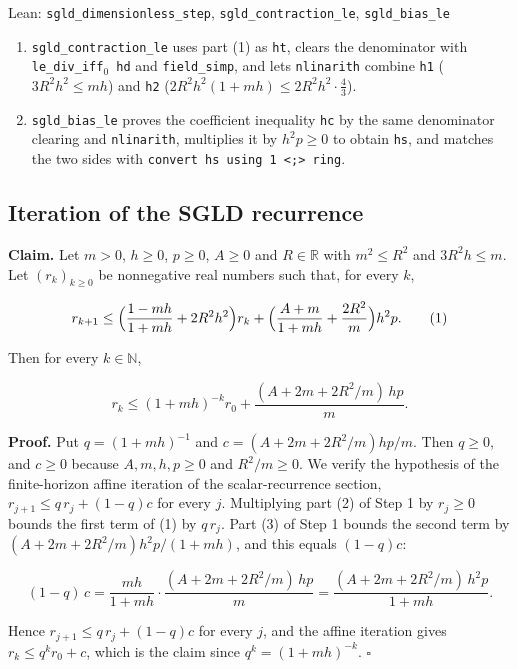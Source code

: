 \documentclass[11pt,a4paper]{report}
\begin{document}
\begin{leanbox}{Lean: \texttt{sgld\_\allowbreak{}dimensionless\_\allowbreak{}step}, \texttt{sgld\_\allowbreak{}contraction\_\allowbreak{}le}, \texttt{sgld\_\allowbreak{}bias\_\allowbreak{}le}}
\begin{enumerate}
\item \texttt{sgld\_\allowbreak{}contraction\_\allowbreak{}le} uses part (1) as \texttt{ht}, clears the denominator with \texttt{le\_\allowbreak{}div\_\allowbreak{}iff\ensuremath{{}_{0}} hd} and \texttt{field\_\allowbreak{}simp}, and lets \texttt{nlinarith} combine \texttt{h1} (\(3R^2h^2\le mh\)) and \texttt{h2} (\(2R^2h^2(1+mh)\le2R^2h^2\cdot\frac43\)).

\item \texttt{sgld\_\allowbreak{}bias\_\allowbreak{}le} proves the coefficient inequality \texttt{hc} by the same denominator clearing and \texttt{nlinarith}, multiplies it by \(h^2p\ge0\) to obtain \texttt{hs}, and matches the two sides with \texttt{convert hs using 1 <;> ring}.

\end{enumerate}
\end{leanbox}
\subsection{\texorpdfstring{Iteration of the SGLD recurrence}{Iteration of the SGLD recurrence}}
\label{report-step-AverageLMC-SGLDRecurrence-lean-2}


\textbf{Claim.} Let \(m>0\), \(h\ge0\), \(p\ge0\), \(A\ge0\) and \(R\in\mathbb R\) with \(m^2\le R^2\) and \(3R^2h\le m\). Let \((r_k)_{k\ge0}\) be nonnegative real numbers such that, for every \(k\),


\[r_{k+1}\le\Bigl(\frac{1-mh}{1+mh}+2R^2h^2\Bigr)r_k+\Bigl(\frac{A+m}{1+mh}+\frac{2R^2}m\Bigr)h^2p.\qquad(1)\]


Then for every \(k\in\mathbb N\),


\[r_k\le(1+mh)^{-k}r_0+\frac{(A+2m+2R^2/m)\,hp}m.\]


\textbf{Proof.} Put \(q=(1+mh)^{-1}\) and \(c=(A+2m+2R^2/m)hp/m\). Then \(q\ge0\), and \(c\ge0\) because \(A,m,h,p\ge0\) and \(R^2/m\ge0\). We verify the hypothesis of the finite-horizon affine iteration of the scalar-recurrence section, \(r_{j+1}\le q\,r_j+(1-q)c\) for every \(j\). Multiplying part (2) of Step 1 by \(r_j\ge0\) bounds the first term of (1) by \(q\,r_j\). Part (3) of Step 1 bounds the second term by \((A+2m+2R^2/m)h^2p/(1+mh)\), and this equals \((1-q)c\):


\[(1-q)\,c=\frac{mh}{1+mh}\cdot\frac{(A+2m+2R^2/m)\,hp}m=\frac{(A+2m+2R^2/m)\,h^2p}{1+mh}.\]


Hence \(r_{j+1}\le q\,r_j+(1-q)c\) for every \(j\), and the affine iteration gives \(r_k\le q^kr_0+c\), which is the claim since \(q^k=(1+mh)^{-k}\). \(\square\)
\end{document}
